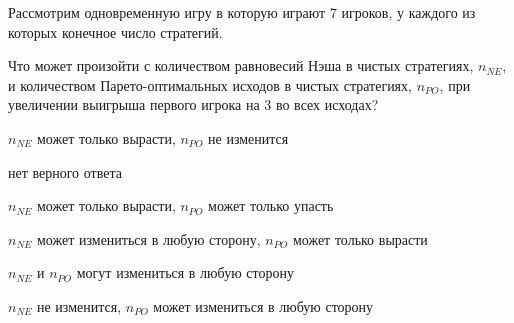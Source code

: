 
\begin{question}
Рассмотрим одновременную игру в которую играют 7 игроков, у каждого из которых конечное число стратегий.

Что может произойти с количеством равновесий Нэша в чистых стратегиях, \(n_{NE}\), и количеством Парето-оптимальных исходов в чистых стратегиях, \(n_{PO}\),
при увеличении выигрыша первого игрока на 3 во всех исходах?
\begin{answerlist}
  \item \(n_{NE}\) может только вырасти, \(n_{PO}\) не изменится
  \item нет верного ответа
  \item \(n_{NE}\) может только вырасти, \(n_{PO}\) может только упасть
  \item \(n_{NE}\) может измениться в любую сторону, \(n_{PO}\) может только вырасти
  \item \(n_{NE}\) и \(n_{PO}\) могут измениться в любую сторону
  \item \(n_{NE}\) не изменится, \(n_{PO}\) может измениться в любую сторону
\end{answerlist}
\end{question}


